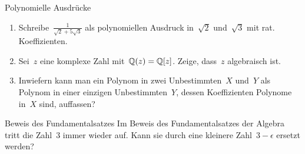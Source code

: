 \documentclass{algblatt}
\begin{document}
\begin{aufgabe}{Polynomielle Ausdrücke}
\begin{enumerate}
\item Schreibe~$\frac{1}{\sqrt{2} + 5\sqrt{3}}$ als polynomiellen Ausdruck
in~$\sqrt{2}$ und~$\sqrt{3}$ mit rat. Koeffizienten.
\item Sei~$z$ eine komplexe Zahl mit~$\mathbb{Q}(z) = \mathbb{Q}[z]$. Zeige, dass~$z$
algebraisch ist.
\item Inwiefern kann man ein Polynom in zwei Unbestimmten~$X$ und~$Y$ als
Polynom in einer einzigen Unbestimmten~$Y$, dessen Koeffizienten
Polynome in~$X$ sind, auffassen?
\end{enumerate}
\end{aufgabe}

\begin{aufgabe}{Beweis des Fundamentalsatzes}
Im Beweis des Fundamentalsatzes der Algebra tritt die Zahl~3 immer wieder auf.
Kann sie durch eine kleinere Zahl~$3-\epsilon$ ersetzt werden?
\end{aufgabe}
\end{document}
